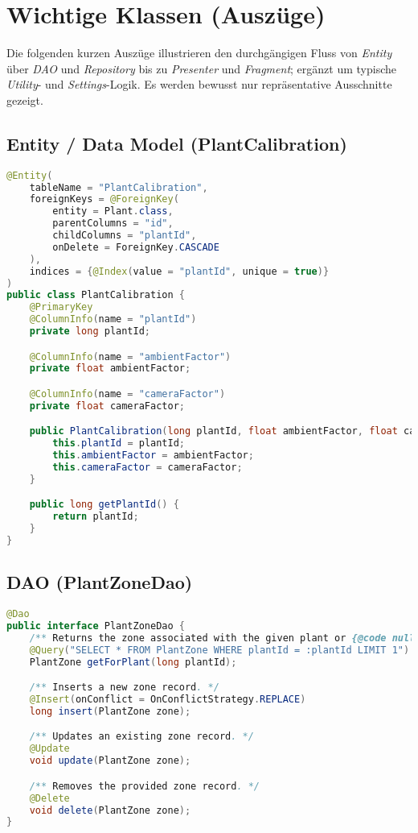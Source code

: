 \documentclass[14pt,a4paper]{report}
\begin{document}
\section{Wichtige Klassen (Auszüge)}
Die folgenden kurzen Auszüge illustrieren den durchgängigen Fluss von \emph{Entity} über \emph{DAO} und \emph{Repository} bis zu \emph{Presenter} und \emph{Fragment}; ergänzt um typische \emph{Utility}- und \emph{Settings}-Logik. Es werden bewusst nur repräsentative Ausschnitte gezeigt.

\subsection*{Entity / Data Model (PlantCalibration)}
\begin{lstlisting}[language=Java, caption={Entity PlantCalibration.java (Auszug)}]
@Entity(
    tableName = "PlantCalibration",
    foreignKeys = @ForeignKey(
        entity = Plant.class,
        parentColumns = "id",
        childColumns = "plantId",
        onDelete = ForeignKey.CASCADE
    ),
    indices = {@Index(value = "plantId", unique = true)}
)
public class PlantCalibration {
    @PrimaryKey
    @ColumnInfo(name = "plantId")
    private long plantId;

    @ColumnInfo(name = "ambientFactor")
    private float ambientFactor;

    @ColumnInfo(name = "cameraFactor")
    private float cameraFactor;

    public PlantCalibration(long plantId, float ambientFactor, float cameraFactor) {
        this.plantId = plantId;
        this.ambientFactor = ambientFactor;
        this.cameraFactor = cameraFactor;
    }

    public long getPlantId() {
        return plantId;
    }
}
\end{lstlisting}

\subsection*{DAO (PlantZoneDao)}
\begin{lstlisting}[language=Java, caption={DAO PlantZoneDao.java (Auszug)}]
@Dao
public interface PlantZoneDao {
    /** Returns the zone associated with the given plant or {@code null}. */
    @Query("SELECT * FROM PlantZone WHERE plantId = :plantId LIMIT 1")
    PlantZone getForPlant(long plantId);

    /** Inserts a new zone record. */
    @Insert(onConflict = OnConflictStrategy.REPLACE)
    long insert(PlantZone zone);

    /** Updates an existing zone record. */
    @Update
    void update(PlantZone zone);

    /** Removes the provided zone record. */
    @Delete
    void delete(PlantZone zone);
}
\end{lstlisting}
\end{document}
